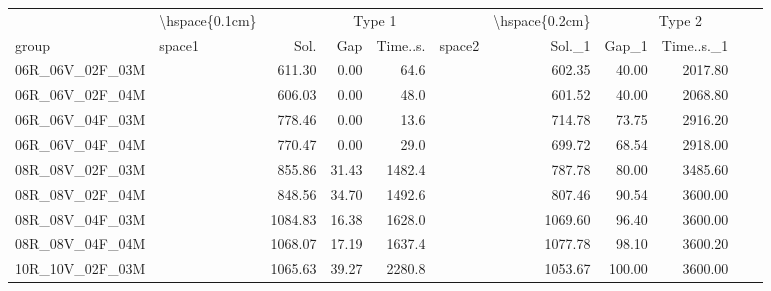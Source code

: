 
\begin{tabular}{llrrrlrrr}
\toprule
\multicolumn{1}{c}{} & \multicolumn{1}{c}{\textbackslash{}hspace\{0.1cm\}} & \multicolumn{4}{c}{Type 1} & \multicolumn{1}{c}{\textbackslash{}hspace\{0.2cm\}} & \multicolumn{4}{c}{Type 2} \\
\cmidrule(l{3pt}r{3pt}){2-2} \cmidrule(l{3pt}r{3pt}){3-6} \cmidrule(l{3pt}r{3pt}){7-7} \cmidrule(l{3pt}r{3pt}){8-11}
group & space1 & Sol. & Gap & Time..s. & space2 & Sol.\_1 & Gap\_1 & Time..s.\_1\\
\midrule
06R\_06V\_02F\_03M & \hspace{0.1cm} & 611.30 & 0.00 & 64.6 & \hspace{0.2cm} & 602.35 & 40.00 & 2017.80\\
06R\_06V\_02F\_04M & \hspace{0.1cm} & 606.03 & 0.00 & 48.0 & \hspace{0.2cm} & 601.52 & 40.00 & 2068.80\\
06R\_06V\_04F\_03M & \hspace{0.1cm} & 778.46 & 0.00 & 13.6 & \hspace{0.2cm} & 714.78 & 73.75 & 2916.20\\
06R\_06V\_04F\_04M & \hspace{0.1cm} & 770.47 & 0.00 & 29.0 & \hspace{0.2cm} & 699.72 & 68.54 & 2918.00\\
\addlinespace
08R\_08V\_02F\_03M & \hspace{0.1cm} & 855.86 & 31.43 & 1482.4 & \hspace{0.2cm} & 787.78 & 80.00 & 3485.60\\
08R\_08V\_02F\_04M & \hspace{0.1cm} & 848.56 & 34.70 & 1492.6 & \hspace{0.2cm} & 807.46 & 90.54 & 3600.00\\
08R\_08V\_04F\_03M & \hspace{0.1cm} & 1084.83 & 16.38 & 1628.0 & \hspace{0.2cm} & 1069.60 & 96.40 & 3600.00\\
08R\_08V\_04F\_04M & \hspace{0.1cm} & 1068.07 & 17.19 & 1637.4 & \hspace{0.2cm} & 1077.78 & 98.10 & 3600.20\\
\addlinespace
10R\_10V\_02F\_03M & \hspace{0.1cm} & 1065.63 & 39.27 & 2280.8 & \hspace{0.2cm} & 1053.67 & 100.00 & 3600.00\\

\end{tabular}
